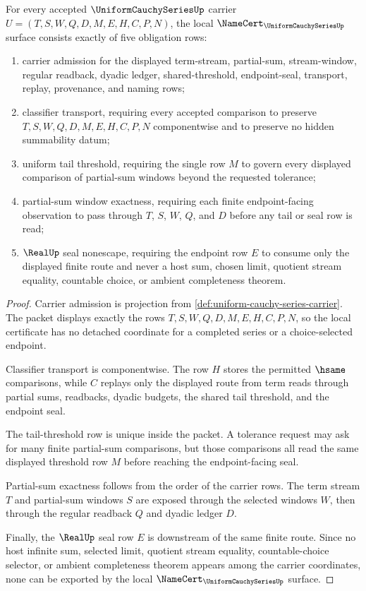 \begin{theorem}\label{thm:uniform-cauchy-series-namecert-obligations}
For every accepted $\UniformCauchySeriesUp$ carrier $U=(T,S,W,Q,D,M,E,H,C,P,N)$, the local $\NameCert_{\UniformCauchySeriesUp}$ surface consists exactly of five obligation rows:
\begin{enumerate}
\item carrier admission for the displayed term-stream, partial-sum, stream-window, regular readback, dyadic ledger, shared-threshold, endpoint-seal, transport, replay, provenance, and naming rows;
\item classifier transport, requiring every accepted comparison to preserve $T,S,W,Q,D,M,E,H,C,P,N$ componentwise and to preserve no hidden summability datum;
\item uniform tail threshold, requiring the single row $M$ to govern every displayed comparison of partial-sum windows beyond the requested tolerance;
\item partial-sum window exactness, requiring each finite endpoint-facing observation to pass through $T$, $S$, $W$, $Q$, and $D$ before any tail or seal row is read;
\item $\RealUp$ seal nonescape, requiring the endpoint row $E$ to consume only the displayed finite route and never a host sum, chosen limit, quotient stream equality, countable choice, or ambient completeness theorem.
\end{enumerate}
\end{theorem}
\begin{proof}
Carrier admission is projection from \autoref{def:uniform-cauchy-series-carrier}. The packet displays exactly the rows $T,S,W,Q,D,M,E,H,C,P,N$, so the local certificate has no detached coordinate for a completed series or a choice-selected endpoint.

Classifier transport is componentwise. The row $H$ stores the permitted $\hsame$ comparisons, while $C$ replays only the displayed route from term reads through partial sums, readbacks, dyadic budgets, the shared tail threshold, and the endpoint seal.

The tail-threshold row is unique inside the packet. A tolerance request may ask for many finite partial-sum comparisons, but those comparisons all read the same displayed threshold row $M$ before reaching the endpoint-facing seal.

Partial-sum exactness follows from the order of the carrier rows. The term stream $T$ and partial-sum windows $S$ are exposed through the selected windows $W$, then through the regular readback $Q$ and dyadic ledger $D$.

Finally, the $\RealUp$ seal row $E$ is downstream of the same finite route. Since no host infinite sum, selected limit, quotient stream equality, countable-choice selector, or ambient completeness theorem appears among the carrier coordinates, none can be exported by the local $\NameCert_{\UniformCauchySeriesUp}$ surface.
\end{proof}

